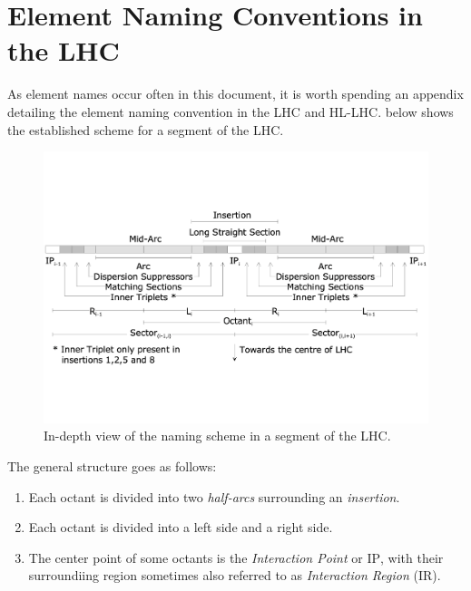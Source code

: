 \chapter{Element Naming Conventions in the LHC} %

\label{Appendix_Naming_Conventions} %


As element names occur often in this document, it is worth spending an appendix detailing the element naming convention in the LHC and HL-LHC.
 below shows the established scheme for a segment of the LHC.

\begin{figure}[h]
    \centering
    \includegraphics*[width=0.9\linewidth]{Figures/Appendices/LHC_naming_scheme.pdf}
    \caption{In-depth view of the naming scheme in a segment of the LHC.}
    \label{figure:lhc_segment_naming_scheme}
  \end{figure}

The general structure goes as follows:
\begin{enumerate}
    \item Each octant is divided into two \textit{half-arcs} surrounding an \textit{insertion}.
    \item Each octant is divided into a left side and a right side.
    \item The center point of some octants is the \textit{Interaction Point} or $\mathrm{IP}$, with their surroundiing region sometimes also referred to as \textit{Interaction Region} ($\mathrm{IR}$).
\end{enumerate}

